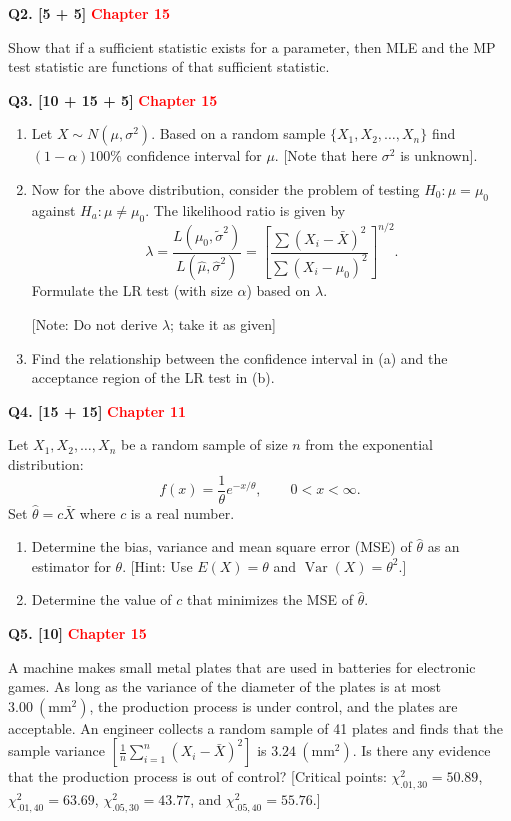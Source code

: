 \documentclass[11pt]{article}
\begin{document}
\bigskip
\textbf{Q2. [5 + 5]}  \textbf{\textcolor{red}{Chapter 15}}

Show that if a sufficient statistic exists for a parameter, then MLE and the MP test statistic are functions of that sufficient statistic.

\bigskip
\textbf{Q3. [10 + 15 + 5]}  \textbf{\textcolor{red}{Chapter 15}}

\begin{enumerate}
\setlength{\itemsep}{6pt}\setlength{\parsep}{0pt}\setlength{\topsep}{3pt}
\item[(a)] Let $X\sim N(\mu,\sigma^2)$. Based on a random sample $\{X_1,X_2,\ldots,X_n\}$ find $(1-\alpha)100\%$ confidence interval for $\mu$. [Note that here $\sigma^2$ is unknown].

\item[(b)] Now for the above distribution, consider the problem of testing $H_0:\mu=\mu_0$ against $H_a:\mu\neq\mu_0$. The likelihood ratio is given by
\[
\lambda=\frac{L(\mu_0,\tilde\sigma^2)}{L(\hat\mu,\hat\sigma^2)}
=\left[\frac{\sum (X_i-\bar X)^2}{\sum (X_i-\mu_0)^2}\right]^{n/2}.
\]
Formulate the LR test (with size $\alpha$) based on $\lambda$.

[Note: Do not derive $\lambda$; take it as given]

\item[(c)] Find the relationship between the confidence interval in (a) and the acceptance region of the LR test in (b).
\end{enumerate}

\clearpage
\textbf{Q4. [15 + 15]}  \textbf{\textcolor{red}{Chapter 11}}

Let $X_1,X_2,\ldots,X_n$ be a random sample of size $n$ from the exponential distribution:
\[
f(x)=\frac{1}{\theta}e^{-x/\theta},\qquad 0<x<\infty.
\]
Set $\hat\theta=c\bar X$ where $c$ is a real number.
\begin{enumerate}
\setlength{\itemsep}{4pt}\setlength{\parsep}{0pt}\setlength{\topsep}{3pt}
\item[(a)] Determine the bias, variance and mean square error (MSE) of $\hat\theta$ as an estimator for $\theta$. [Hint: Use $E(X)=\theta$ and $\operatorname{Var}(X)=\theta^2$.]
\item[(b)] Determine the value of $c$ that minimizes the MSE of $\hat\theta$.
\end{enumerate}

\bigskip
\textbf{Q5. [10]}  \textbf{\textcolor{red}{Chapter 15}}

A machine makes small metal plates that are used in batteries for electronic games. As long as the variance of the diameter of the plates is at most $3.00\ (\mathrm{mm}^2)$, the production process is under control, and the plates are acceptable. An engineer collects a random sample of 41 plates and finds that the sample variance $\left[\frac{1}{n}\sum_{i=1}^{n}(X_i-\bar X)^2\right]$ is $3.24\ (\mathrm{mm}^2)$. Is there any evidence that the production process is out of control? [Critical points: $\chi^2_{.01,30}=50.89$, $\chi^2_{.01,40}=63.69$, $\chi^2_{.05,30}=43.77$, and $\chi^2_{.05,40}=55.76$.]
\end{document}

